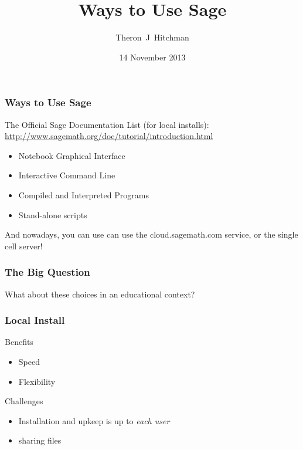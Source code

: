 \documentclass{beamer}
\begin{document}
\title[Ways to Sage]{Ways to Use Sage}
\author{Theron~J~Hitchman}

\date[Augustana Workshop]{14 November 2013}

\frame{\titlepage}


\begin{frame}
\frametitle{Ways to Use Sage}

The Official Sage Documentation List (for local installs):
{\tiny
\url{http://www.sagemath.org/doc/tutorial/introduction.html}}

\begin{itemize}
\item Notebook Graphical Interface
\item Interactive Command Line
\item Compiled and Interpreted Programs
\item Stand-alone scripts
\end{itemize}

And nowadays, you can use can use the cloud.sagemath.com service, or the single cell server!
\end{frame}


\begin{frame}

\frametitle{The Big Question}

What about these choices in an educational context?
\end{frame}



\begin{frame}
\frametitle{Local Install}

\begin{block}{Benefits}
\begin{itemize}
\item Speed
\item Flexibility
\end{itemize}
\end{block}

\begin{block}{Challenges}
\begin{itemize}
\item Installation and upkeep is up to \emph{each user}
\item sharing files
\end{itemize}
\end{block}

\end{frame}
\end{document}
